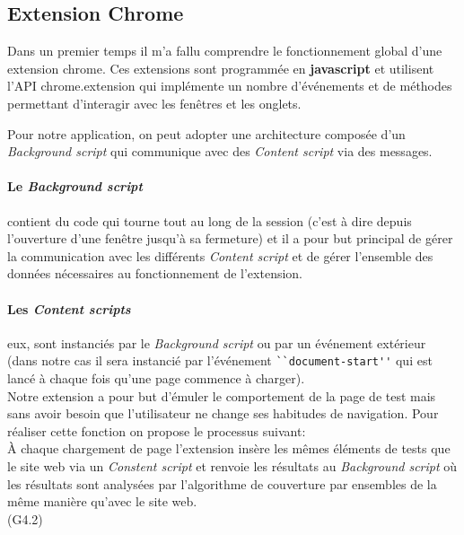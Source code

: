 \documentclass[oneside,a4paper,12pt]{article}
\begin{document}
\subsection{Extension Chrome}\label{Projet:extension}

Dans un premier temps il m'a fallu comprendre le fonctionnement global d'une extension chrome. Ces extensions sont programmée en \textbf{javascript} et utilisent l'API chrome.extension qui implémente un nombre d'événements et de méthodes permettant d'interagir avec les fenêtres et les onglets. 

Pour notre application, on peut adopter une architecture composée d'un \textit{Background script} qui communique avec des \textit{Content script} via des messages. 
\paragraph*{Le \textit{Background script}} contient du code qui tourne tout au long de la session (c'est à dire depuis l'ouverture d'une fenêtre jusqu'à sa fermeture) et il a pour but principal de gérer la communication avec les différents \textit{Content script} et de gérer l'ensemble des données nécessaires au fonctionnement de l'extension.
\paragraph*{Les \textit{Content scripts}} eux, sont instanciés par le \textit{Background script} ou par un événement extérieur (dans notre cas il sera instancié par l'événement \lstinline{``document-start''} qui est lancé à chaque fois qu'une page commence à charger).\\

Notre extension a pour but d'émuler le comportement de la page de test mais sans avoir besoin que l'utilisateur ne change ses habitudes de navigation. Pour réaliser cette fonction on propose le processus suivant:\\

\`A chaque chargement de page l'extension insère les mêmes éléments de tests que le site web via un \textit{Constent script} et renvoie les résultats au \textit{Background script} où les résultats sont analysées par l'algorithme de couverture par ensembles de la même manière qu'avec le site web.\\ (G4.2)
\end{document}
